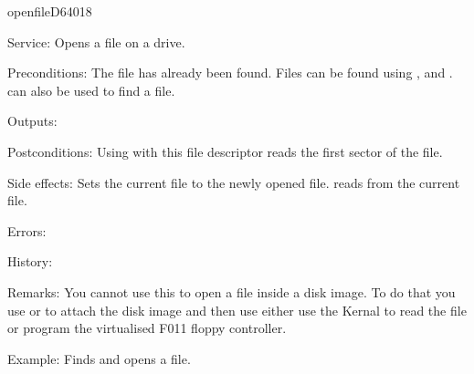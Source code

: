 \newpage
\begin{hyppotrap}{openfile}{D640}{18}
\item [Service:]
  Opens a file on a drive.
\item [Preconditions:]
  The file has already been found. Files can be found using ,
   and .  can also be
  used to find a file.
\item [Outputs:]
\item [Postconditions:]
  Using  with this file descriptor reads the first sector of
  the file.
\item [Side effects:]
  Sets the current file to the newly opened file.  reads
  from the current file.
\item [Errors:]
\item [History:]
\item [Remarks:]
  You cannot use this to open a file inside a disk image. To do that you use
   or  to attach the disk image and
  then use either use the Kernal to read the file or program the virtualised
  F011 floppy controller.
\item [Example:]
  Finds and opens a file.
\end{hyppotrap}


